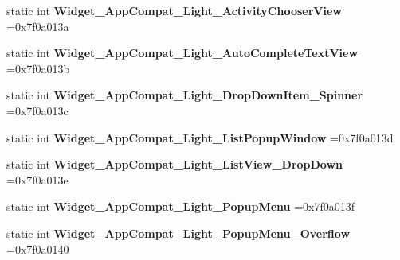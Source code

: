 \begin{DoxyCompactItemize}
\item 
\mbox{\label{classandroid_1_1support_1_1graphics_1_1drawable_1_1R_1_1style_ab6ef973498655368d9d5593945e9d247}} 
static int {\bfseries Widget\+\_\+\+App\+Compat\+\_\+\+Light\+\_\+\+Activity\+Chooser\+View} =0x7f0a013a
\item 
\mbox{\label{classandroid_1_1support_1_1graphics_1_1drawable_1_1R_1_1style_a0f05c0be88da37ae844d742476c10219}} 
static int {\bfseries Widget\+\_\+\+App\+Compat\+\_\+\+Light\+\_\+\+Auto\+Complete\+Text\+View} =0x7f0a013b
\item 
\mbox{\label{classandroid_1_1support_1_1graphics_1_1drawable_1_1R_1_1style_a64594411ae45ce519c88842626c5f63a}} 
static int {\bfseries Widget\+\_\+\+App\+Compat\+\_\+\+Light\+\_\+\+Drop\+Down\+Item\+\_\+\+Spinner} =0x7f0a013c
\item 
\mbox{\label{classandroid_1_1support_1_1graphics_1_1drawable_1_1R_1_1style_ae2a53720684ffb9182310c4323458a2d}} 
static int {\bfseries Widget\+\_\+\+App\+Compat\+\_\+\+Light\+\_\+\+List\+Popup\+Window} =0x7f0a013d
\item 
\mbox{\label{classandroid_1_1support_1_1graphics_1_1drawable_1_1R_1_1style_a15c41f8777f7a4bbc2537686f57322db}} 
static int {\bfseries Widget\+\_\+\+App\+Compat\+\_\+\+Light\+\_\+\+List\+View\+\_\+\+Drop\+Down} =0x7f0a013e
\item 
\mbox{\label{classandroid_1_1support_1_1graphics_1_1drawable_1_1R_1_1style_a7da5cad0500bd6213f32ded51f2ec9da}} 
static int {\bfseries Widget\+\_\+\+App\+Compat\+\_\+\+Light\+\_\+\+Popup\+Menu} =0x7f0a013f
\item 
\mbox{\label{classandroid_1_1support_1_1graphics_1_1drawable_1_1R_1_1style_af246be81313d335340fbaaa4201f749c}} 
static int {\bfseries Widget\+\_\+\+App\+Compat\+\_\+\+Light\+\_\+\+Popup\+Menu\+\_\+\+Overflow} =0x7f0a0140

\end{DoxyCompactItemize}
